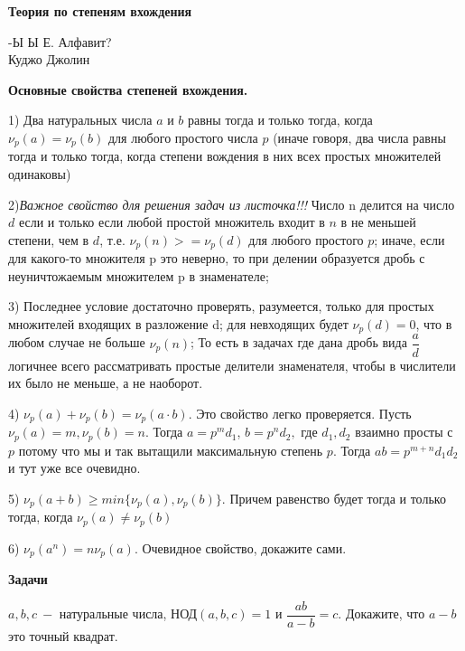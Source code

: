 \hspace{3mm}

\centerline{\bf \Huge Теория по степеням вхождения}

\begin{flushright}
    \scriptsize{-Ы Ы Е. Алфавит?\\Куджо Джолин}
\end{flushright}


\textbf{\Large Основные свойства степеней вхождения.}

1) Два натуральных числа $a$ и $b$ равны тогда и только тогда, когда $\nu_p(a) = \nu_p(b)$ для любого простого числа $p$ (иначе говоря, два числа равны тогда и только тогда, когда степени вождения в них всех простых множителей одинаковы)

2)\textit{Важное свойство для решения задач из листочка!!!} Число n делится на число $d$ если и только если любой простой множитель входит в $n$ в не меньшей степени, чем в $d$, т.е. $\nu_p(n)>=\nu_p(d)$ для любого простого $p$; иначе, если для какого-то множителя p это неверно, то при делении образуется дробь с неуничтожаемым множителем p в знаменателе;

3) Последнее условие достаточно проверять, разумеется, только для простых множителей входящих в разложение d; для невходящих будет $\nu_p(d)=0$, что в любом случае не больше $\nu_p(n)$; То есть в задачах где дана дробь вида $\dfrac{a}{d}$ логичнее всего рассматривать простые делители знаменателя, чтобы в числители их было не меньше, а не наоборот.

4) $\nu_p(a)+\nu_p(b) = \nu_p(a\cdot b)$. Это свойство легко проверяется. Пусть $\nu_p(a) = m, \nu_p(b) = n$. Тогда $a = p^md_1$, $b = p^nd_2,$ где $d_1, d_2$ взаимно просты с $p$ потому что мы и так вытащили максимальную степень $p$. Тогда $ab = p^{m+n}d_1d_2$ и тут уже все очевидно.  

5) $\nu_p(a+b)\geq min\{\nu_p(a), \nu_p(b)\}$. Причем равенство будет тогда и только тогда, когда $\nu_p(a) \neq \nu_p(b)$

6) $\nu_p(a^n) = n\nu_p(a)$. Очевидное свойство, докажите сами. 

\hspace{3mm}

\textbf{\large Задачи}

\hspace{3mm}

 $a, b, c \ -$ натуральные числа, НОД$(a, b, c) = 1$ и $\dfrac{ab}{a-b} = c$. Докажите, что $a-b$ это точный квадрат.

